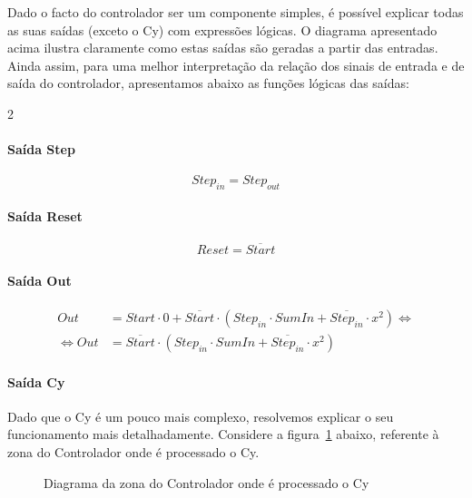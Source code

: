 Dado o facto do controlador ser um componente simples, é possível explicar todas as suas saídas (exceto o Cy) com expressões lógicas. O diagrama apresentado acima ilustra claramente como estas saídas são geradas a partir das entradas. Ainda assim, para uma melhor interpretação da relação dos sinais de entrada e de saída do controlador, apresentamos abaixo as funções lógicas das saídas:

\begin{multicols}{2}
    \paragraph{Saída Step}
    \begin{equation}
        Step_{in} = Step_{out}
    \end{equation}
    \paragraph{Saída Reset}
    \begin{equation}
        Reset = \overline{Start}
    \end{equation}

\end{multicols}

\paragraph{Saída Out}
\begin{align}
    Out                 & = Start \cdot 0 + \overline{Start} \cdot (Step_{in}\cdot Sum In + \overline{Step_{in}} \cdot x^2) \Leftrightarrow \\
    \Leftrightarrow Out & = \overline{Start} \cdot (Step_{in}\cdot Sum In + \overline{Step_{in}} \cdot x^2)
\end{align}

\paragraph{Saída Cy}
Dado que o Cy é um pouco mais complexo, resolvemos explicar o seu funcionamento mais detalhadamente. Considere a figura~\ref{fig:Controller_cy} abaixo, referente à zona do Controlador onde é processado o Cy.

\begin{figure}[H]
    \centering
    
    \caption{Diagrama da zona do Controlador onde é processado o Cy}\label{fig:Controller_cy}
\end{figure}


